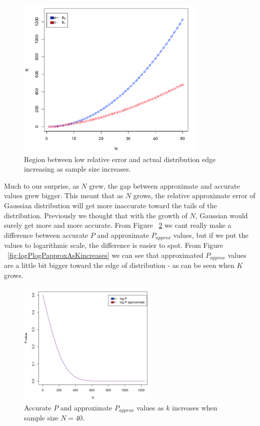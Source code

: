 \documentclass[12pt]{article}
\begin{document}
{\begin{figure}[H]
	\centering
  \includegraphics[width=0.8\textwidth]{T0vsN}
	\caption{Region between low relative error and actual distribution edge increasing as sample size increases.}
	\label{fig:T0vsN}
\end{figure}

Much to our surprise, as $N$ grew, the gap between approximate and accurate values grew bigger. This meant that as $N$ grows, the relative approximate error of Gaussian distribution will get more inaccurate toward the tails of the distribution. Previously we thought that with the growth of $N$, Gaussian would surely get more and more accurate.
From Figure ~\ref{fig:PandPapproxAsKincreases} we cant really make a difference between accurate $P$ and approximate $P_{approx}$ values, but if we put the values to logarithmic scale, the difference is easier to spot. From Figure ~\ref{fig:logPlogPapproxAsKincreases} we can see that approximated $P_{approx}$ values are a little bit bigger toward the edge of distribution - as can be seen when $K$ grows.

\begin{figure}[H]
  \centering
  \includegraphics[width=0.6\textwidth]{PandPapproxAsKincreases}
  \caption{Accurate $P$ and approximate $P_{approx}$ values as $k$ increases when sample size $N=40$.}
  \label{fig:PandPapproxAsKincreases}
\end{figure}

}
\end{document}
